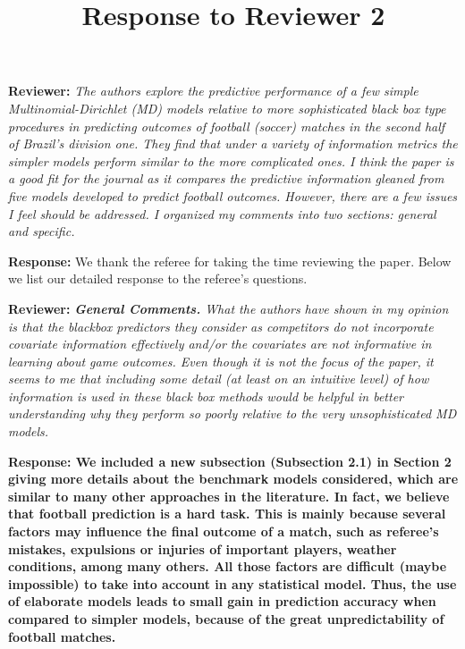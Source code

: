 \documentclass[11pt]{article}
\title{Response to Reviewer 2}
\date{}
\begin{document}


\maketitle

\hspace{4mm} \textbf{Reviewer:} \textit{
	The authors explore the predictive performance of a few simple Multinomial-Dirichlet (MD)
	models relative to more sophisticated black box type procedures in predicting outcomes of
	football (soccer) matches in the second half of Brazil's division one. They find that under a
	variety of information metrics the simpler models perform similar to the more complicated ones.
	I think the paper is a good fit for the journal as it compares the predictive information gleaned
	from five models developed to predict football outcomes. However, there are a few issues I feel
	should be addressed. I organized my comments into two sections: general and specific.}

\vspace{2mm}
\textbf{Response:} We thank the referee for taking the time reviewing the paper. Below we list our detailed response to the referee's questions.\\

\vspace{6mm}

\hspace{4mm} \textbf{Reviewer:} \textit{\textbf{General Comments.}
	What the authors have shown in my opinion is that the blackbox predictors they consider as
	competitors do not incorporate covariate information effectively and/or the covariates are not
	informative in learning about game outcomes. Even though it is not the focus of the paper,
	it seems to me that including some detail (at least on an intuitive level) of how information is
	used in these black box methods would be helpful in better understanding why they perform so
	poorly relative to the very unsophisticated MD models.}

\vspace{2mm}
\textbf{Response: We included a new subsection
	(Subsection 2.1) in Section 2 giving more details about the
	benchmark models considered, which are similar to many other
	approaches in the literature. In fact, we believe that football
	prediction is a hard task. This is mainly because several
	factors may influence the final outcome of a match, such
	as referee's mistakes, expulsions or injuries of important
	players, weather conditions, among many others. All those factors are difficult
	(maybe impossible) to take into account in any statistical model.
	Thus, the use of elaborate models leads to small gain in prediction
	accuracy when compared to simpler models, because of the great
	unpredictability of football matches.} 
\end{document}
